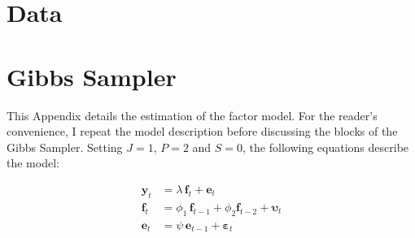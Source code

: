 \documentclass[notitlepage,a4paper,12pt]{article}
\begin{document}
\pagebreak

\section{Data}

\pagebreak
\section{Gibbs Sampler}

This Appendix details the estimation of the factor model. For the reader's convenience, I repeat the model description before discussing the blocks of the Gibbs Sampler. Setting $J=1$, $P=2$ and $S=0$, the following equations describe the model: 

\begin{subequations}
    \label{eqn:app_model}
    \begin{align}
        \mathbf{y}_t &=  \lambda \, \mathbf{f}_{t} + \mathbf{e}_t \label{eqn:app_facmod_obs}\\ 
        \mathbf{f}_t &= \phi_1 \, \mathbf{f}_{t-1} + \phi_2 \mathbf{f}_{t-2} + \boldsymbol{\upsilon}_t \label{eqn:app_facmod_factors}\\
        \mathbf{e}_t &= \psi \, \mathbf{e}_{t-1} + \boldsymbol{\varepsilon}_t \label{eqn:app_facmod_idios}
    \end{align}
\end{subequations}
\end{document}
